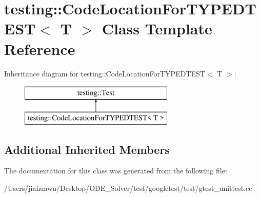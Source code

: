 \hypertarget{classtesting_1_1_code_location_for_t_y_p_e_d_t_e_s_t}{}\section{testing\+:\+:Code\+Location\+For\+T\+Y\+P\+E\+D\+T\+E\+ST$<$ T $>$ Class Template Reference}
\label{classtesting_1_1_code_location_for_t_y_p_e_d_t_e_s_t}
Inheritance diagram for testing\+:\+:Code\+Location\+For\+T\+Y\+P\+E\+D\+T\+E\+ST$<$ T $>$\+:\begin{figure}[H]
\begin{center}
\leavevmode
\includegraphics[height=2.000000cm]{classtesting_1_1_code_location_for_t_y_p_e_d_t_e_s_t}
\end{center}
\end{figure}
\subsection*{Additional Inherited Members}


The documentation for this class was generated from the following file\+:\begin{DoxyCompactItemize}
\item 
/\+Users/jiahuawu/\+Desktop/\+O\+D\+E\+\_\+\+Solver/test/googletest/test/gtest\+\_\+unittest.\+cc\end{DoxyCompactItemize}
